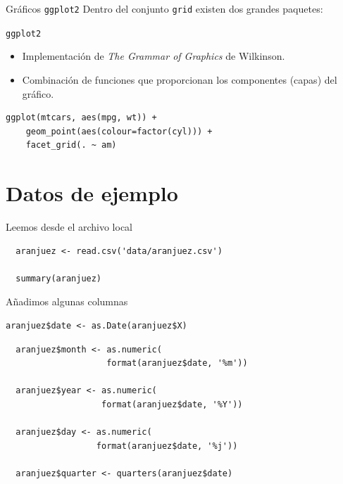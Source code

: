\documentclass[xcolor={usenames,svgnames,dvipsnames}]{beamer}
\begin{document}
\begin{frame}[fragile,label=sec-1-3]{Gráficos \texttt{ggplot2}}
 Dentro del conjunto \texttt{grid} existen dos grandes paquetes:

\begin{block}{\texttt{ggplot2}}
\begin{itemize}
\item Implementación de \emph{The Grammar of Graphics} de Wilkinson.

\item Combinación de funciones que proporcionan los componentes (capas) del gráfico.
\end{itemize}

\lstset{language=R,label= ,caption= ,numbers=none}
\begin{lstlisting}
ggplot(mtcars, aes(mpg, wt)) +
    geom_point(aes(colour=factor(cyl))) +
    facet_grid(. ~ am)
\end{lstlisting}
\end{block}
\end{frame}

\section{Datos de ejemplo}
\label{sec-2}
\begin{frame}[fragile,label=sec-2-1]{Leemos desde el archivo local}
 \lstset{language=R,label= ,caption= ,numbers=none}
\begin{lstlisting}
  aranjuez <- read.csv('data/aranjuez.csv')

  summary(aranjuez)
\end{lstlisting}
\end{frame}

\begin{frame}[fragile,label=sec-2-2]{Añadimos algunas columnas}
 \lstset{language=R,label= ,caption= ,numbers=none}
\begin{lstlisting}
aranjuez$date <- as.Date(aranjuez$X)
\end{lstlisting}
\lstset{language=R,label= ,caption= ,numbers=none}
\begin{lstlisting}
  aranjuez$month <- as.numeric(
                    format(aranjuez$date, '%m'))

  aranjuez$year <- as.numeric(
                   format(aranjuez$date, '%Y'))

  aranjuez$day <- as.numeric(
                  format(aranjuez$date, '%j'))

  aranjuez$quarter <- quarters(aranjuez$date)
\end{lstlisting}
\end{frame}
\end{document}
